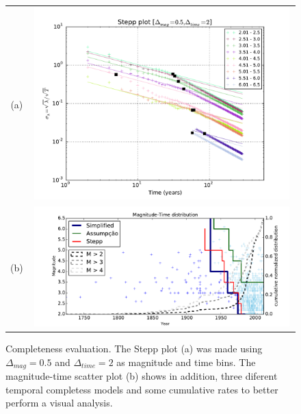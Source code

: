 \documentclass[grl]{agutex}
\begin{document}
\begin{figure}
	\begin{center}
	\begin{table}[H]
		\begin{tabular}{ c c }
		\footnotesize(a)
        & \includegraphics[width=0.99\textwidth]{z_img_completeness_temporal_stepp}
		\\
		\footnotesize(b)
		& \includegraphics[width=0.99\textwidth]{z_img_completeness_temporal_scatter}
		\end{tabular}
	\end{table}
	\caption{Completeness evaluation. 
	The Stepp plot (a) was made using $\Delta_{mag}=0.5$ and $\Delta_{time}=2$ as magnitude and time bins. The magnitude-time scatter plot (b) shows in addition, three diferent temporal completess models and some cumulative rates to better perform a visual analysis.}
	\label{fig_completeness}
	\end{center}
\end{figure}
\end{document}
